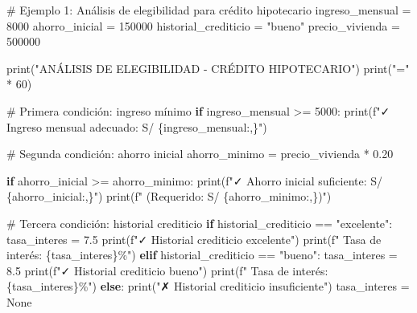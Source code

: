 \documentclass[
  doc,
  floatsintext,
  longtable,
  a4paper,
  nolmodern,
  notxfonts,
  notimes,
  12pt,
  colorlinks=true,linkcolor=blue,citecolor=blue,urlcolor=blue]{apa7}
\newenvironment{Shaded}{\begin{snugshade}}{\end{snugshade}}
\newcommand{\BuiltInTok}[1]{\textcolor[rgb]{0.00,0.23,0.31}{#1}}
\newcommand{\CommentTok}[1]{\textcolor[rgb]{0.37,0.37,0.37}{#1}}
\newcommand{\ControlFlowTok}[1]{\textcolor[rgb]{0.00,0.23,0.31}{\textbf{#1}}}
\newcommand{\DecValTok}[1]{\textcolor[rgb]{0.68,0.00,0.00}{#1}}
\newcommand{\FloatTok}[1]{\textcolor[rgb]{0.68,0.00,0.00}{#1}}
\newcommand{\NormalTok}[1]{\textcolor[rgb]{0.00,0.23,0.31}{#1}}
\newcommand{\OperatorTok}[1]{\textcolor[rgb]{0.37,0.37,0.37}{#1}}
\newcommand{\SpecialCharTok}[1]{\textcolor[rgb]{0.37,0.37,0.37}{#1}}
\newcommand{\SpecialStringTok}[1]{\textcolor[rgb]{0.13,0.47,0.30}{#1}}
\newcommand{\StringTok}[1]{\textcolor[rgb]{0.13,0.47,0.30}{#1}}
\newcommand{\VariableTok}[1]{\textcolor[rgb]{0.07,0.07,0.07}{#1}}
\begin{document}
\begin{Shaded}
\begin{Highlighting}[]
\CommentTok{\# Ejemplo 1: Análisis de elegibilidad para crédito hipotecario}
\NormalTok{ingreso\_mensual }\OperatorTok{=} \DecValTok{8000}
\NormalTok{ahorro\_inicial }\OperatorTok{=} \DecValTok{150000}
\NormalTok{historial\_crediticio }\OperatorTok{=} \StringTok{"bueno"}
\NormalTok{precio\_vivienda }\OperatorTok{=} \DecValTok{500000}

\BuiltInTok{print}\NormalTok{(}\StringTok{"ANÁLISIS DE ELEGIBILIDAD {-} CRÉDITO HIPOTECARIO"}\NormalTok{)}
\BuiltInTok{print}\NormalTok{(}\StringTok{"="} \OperatorTok{*} \DecValTok{60}\NormalTok{)}

\CommentTok{\# Primera condición: ingreso mínimo}
\ControlFlowTok{if}\NormalTok{ ingreso\_mensual }\OperatorTok{\textgreater{}=} \DecValTok{5000}\NormalTok{:}
    \BuiltInTok{print}\NormalTok{(}\SpecialStringTok{f"✓ Ingreso mensual adecuado: S/ }\SpecialCharTok{\{}\NormalTok{ingreso\_mensual}\SpecialCharTok{:,\}}\SpecialStringTok{"}\NormalTok{)}
    
    \CommentTok{\# Segunda condición: ahorro inicial}
\NormalTok{    ahorro\_minimo }\OperatorTok{=}\NormalTok{ precio\_vivienda }\OperatorTok{*} \FloatTok{0.20}
    
    \ControlFlowTok{if}\NormalTok{ ahorro\_inicial }\OperatorTok{\textgreater{}=}\NormalTok{ ahorro\_minimo:}
        \BuiltInTok{print}\NormalTok{(}\SpecialStringTok{f"✓ Ahorro inicial suficiente: S/ }\SpecialCharTok{\{}\NormalTok{ahorro\_inicial}\SpecialCharTok{:,\}}\SpecialStringTok{"}\NormalTok{)}
        \BuiltInTok{print}\NormalTok{(}\SpecialStringTok{f"  (Requerido: S/ }\SpecialCharTok{\{}\NormalTok{ahorro\_minimo}\SpecialCharTok{:,\}}\SpecialStringTok{)"}\NormalTok{)}
        
        \CommentTok{\# Tercera condición: historial crediticio}
        \ControlFlowTok{if}\NormalTok{ historial\_crediticio }\OperatorTok{==} \StringTok{"excelente"}\NormalTok{:}
\NormalTok{            tasa\_interes }\OperatorTok{=} \FloatTok{7.5}
            \BuiltInTok{print}\NormalTok{(}\SpecialStringTok{f"✓ Historial crediticio excelente"}\NormalTok{)}
            \BuiltInTok{print}\NormalTok{(}\SpecialStringTok{f"  Tasa de interés: }\SpecialCharTok{\{}\NormalTok{tasa\_interes}\SpecialCharTok{\}}\SpecialStringTok{\%"}\NormalTok{)}
        \ControlFlowTok{elif}\NormalTok{ historial\_crediticio }\OperatorTok{==} \StringTok{"bueno"}\NormalTok{:}
\NormalTok{            tasa\_interes }\OperatorTok{=} \FloatTok{8.5}
            \BuiltInTok{print}\NormalTok{(}\SpecialStringTok{f"✓ Historial crediticio bueno"}\NormalTok{)}
            \BuiltInTok{print}\NormalTok{(}\SpecialStringTok{f"  Tasa de interés: }\SpecialCharTok{\{}\NormalTok{tasa\_interes}\SpecialCharTok{\}}\SpecialStringTok{\%"}\NormalTok{)}
        \ControlFlowTok{else}\NormalTok{:}
            \BuiltInTok{print}\NormalTok{(}\StringTok{"✗ Historial crediticio insuficiente"}\NormalTok{)}
\NormalTok{            tasa\_interes }\OperatorTok{=} \VariableTok{None}
        

\end{Highlighting}
\end{Shaded}
\end{document}
